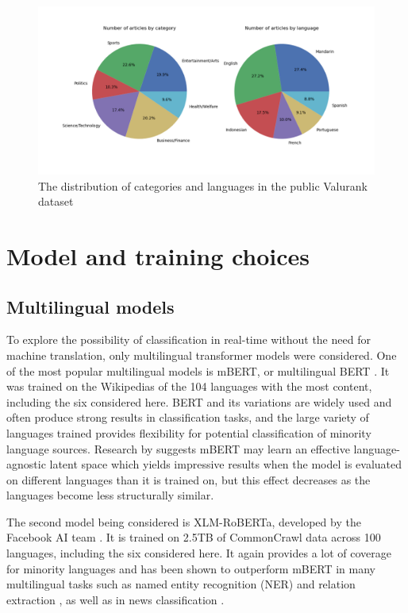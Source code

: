 \documentclass{l4proj}
\begin{document}
\begin{figure}[h]
\includegraphics[width=\textwidth]{images/real_data_distributions.png}
\caption{The distribution of categories and languages in the public Valurank dataset}
\label{fig:collected-distributions}
\end{figure}

\section{Model and training choices}
\subsection{Multilingual models} \hfill \par
To explore the possibility of classification in real-time without the need for machine translation, only multilingual transformer models were considered. One of the most popular multilingual models is mBERT, or multilingual BERT \citep{devlin2018bert}. It was trained on the Wikipedias of the 104 languages with the most content, including the six considered here. BERT and its variations are widely used and often produce strong results in classification tasks, and the large variety of languages trained provides flexibility for potential classification of minority language sources. Research by \cite{pires2019multilingual} suggests mBERT may learn an effective language-agnostic latent space which yields impressive results when the model is evaluated on different languages than it is trained on, but this effect decreases as the languages become less structurally similar. \par
The second model being considered is XLM-RoBERTa, developed by the Facebook AI team \citep{conneau2019unsupervised}. It is trained on 2.5TB of CommonCrawl data across 100 languages, including the six considered here. It again provides a lot of coverage for minority languages and has been shown to outperform mBERT in many multilingual tasks such as named entity recognition (NER) and relation extraction \citep{li2021cross, lan2020empirical}, as well as in news classification \citep{alam2020bangla}.
\end{document}
